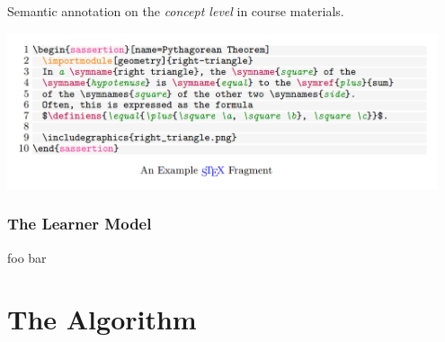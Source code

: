 \documentclass[aspectratio=169, usenames, dvipsnames]{beamer}
\begin{document}
\begin{frame}
\frametitle{\sTeX}
\begin{center}
Semantic annotation on the \emph{concept level} in course materials.\bigskip

\includegraphics[width=0.95\textwidth, keepaspectratio]{images/stex_example.png} 
\end{center}
\end{frame}

\begin{frame}[fragile]
\frametitle{The Learner Model}
\begin{minipage}{0.4\textwidth}
foo bar
\end{minipage}%
\begin{minipage}{0.6\textwidth}
\end{minipage}%
\end{frame}

\section{The Algorithm}
\end{document}
